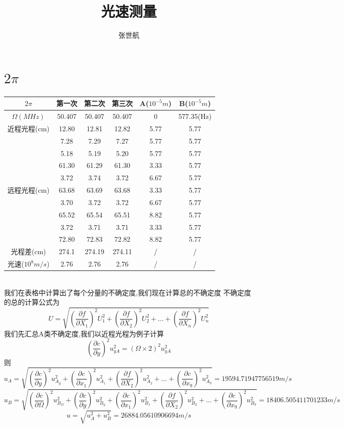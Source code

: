 \documentclass[10pt, a4paper]{article}
\author{张世航}
\title{光速测量}
\begin{document}
\maketitle
\section{\(2\pi\)}
\begin{tabular}{|c|c|c|c|c|c|}
		\hline
		\(2\pi\) &第一次&第二次&第三次&A(\(10^{-5}m\))&B(\(10^{-5}m\))\\
        \hline
        \(\Omega(MHz)\)&50.407&50.407&50.407&0&577.35(Hz)\\
        \hline
        近程光程(cm)&12.80&12.81&12.82&5.77&5.77\\
        \hline
        \multirow{9}{*}{远程光程(cm)}&7.28&7.29&7.27&5.77&5.77\\
        \cline{2-6}
        &5.18&5.19&5.20&5.77&5.77\\
        \cline{2-6}
        &61.30&61.29&61.30&3.33&5.77\\
        \cline{2-6}
        &3.72&3.74&3.72&6.67&5.77\\
        \cline{2-6}
        &63.68&63.69&63.68&3.33&5.77\\
        \cline{2-6}
        &3.70&3.72&3.72&6.67&5.77\\
        \cline{2-6}
        &65.52&65.54&65.51&8.82&5.77\\
        \cline{2-6}
        &3.72&3.71&3.71&3.33&5.77\\
        \cline{2-6}
        &72.80&72.83&72.82&8.82&5.77\\
        \hline
        光程差(cm)&274.1 & 274.19 &274.11&/&/\\
        \hline
        光速(\(10^{8}m/s\))&2.76& 2.76& 2.76&/&/\\
        \hline
\end{tabular}\\
我们在表格中计算出了每个分量的不确定度,我们现在计算总的不确定度
不确定度的总的计算公式为
\begin{equation}
    U = \sqrt{(\frac{\partial f}{\partial X_1})^2U_1^2+(\frac{\partial f}{\partial X_2})^2U_2^2+\ldots+(\frac{\partial f}{\partial X_n})^2U_n^2}
\end{equation}
我们先汇总A类不确定度,我们以近程光程为例子计算
\[(\frac{\partial c}{\partial y})^2u_{yA}^2 = (\Omega\times2)^2u_{yA}^2\]
则
\begin{equation}
    u_A = \sqrt{(\frac{\partial c}{\partial y})^2u_{A_y}^2+(\frac{\partial c}{\partial x_1})^2u_{A_1}^2+(\frac{\partial f}{\partial X_2})^2u_{A_2}^2+\ldots+(\frac{\partial c}{\partial x_9})^2u_{A_9}^2}= 19594.71947756519 m/s
\end{equation}
\begin{equation}
    u_B = \sqrt{(\frac{\partial c}{\partial \Omega})^2u_{B_\Omega}^2+(\frac{\partial c}{\partial y})^2u_{B_y}^2+(\frac{\partial c}{\partial x_1})^2u_{B_1}^2+(\frac{\partial f}{\partial X_2})^2u_{B_2}^2+\ldots+(\frac{\partial c}{\partial x_9})^2u_{B_9}^2}= 18406.505411701233 m/s
\end{equation}
\begin{equation}
    u = \sqrt{u_A^2+u_B^2} = 26884.05610906694m/s
\end{equation}
\end{document}
